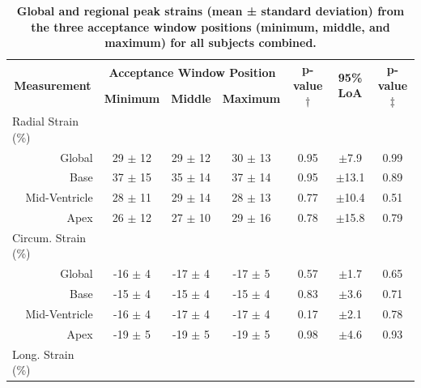 	\begin{landscape}
	\begin{table}
		\centering
		\caption[Global and regional peak strains (mean ± standard deviation) from the three acceptance window positions (minimum, middle, and maximum) for all subjects combined]{\textbf{Global and regional peak strains (mean ± standard deviation) from the three acceptance window positions (minimum, middle, and maximum) for all subjects combined.}}
		\label{table:strainDifferencesPosition}
		\begin{tabular}{c c c c c c c}
			\toprule
			\multirow{2}{*}{\textbf{Measurement}} & \multicolumn{3}{c}{\textbf{Acceptance Window Position}} & \multirow{2}{*}{\textbf{p-value$\dagger$}} & \multirow{2}{*}{\textbf{95\% LoA}}    & \multirow{2}{*}{\textbf{p-value$\ddagger$}} \\ 
			                                      & \textbf{Minimum} & \textbf{Middle} & \textbf{Maximum} & & &    \\
			\midrule
			\multicolumn{1}{l}{Radial Strain (\%)} & & & & & &       								              \\
			\multicolumn{1}{r}{Global}  	  & 29 $\pm$ 12 & 29 $\pm$ 12 & 30 $\pm$ 13 & 0.95 & $\pm$7.9  & 0.99 \\
			\multicolumn{1}{r}{Base}  		  & 37 $\pm$ 15 & 35 $\pm$ 14 & 37 $\pm$ 14 & 0.95 & $\pm$13.1 & 0.89 \\
			\multicolumn{1}{r}{Mid-Ventricle} & 28 $\pm$ 11 & 29 $\pm$ 14 & 28 $\pm$ 13 & 0.77 & $\pm$10.4 & 0.51 \\
			\multicolumn{1}{r}{Apex}  		  & 26 $\pm$ 12 & 27 $\pm$ 10 & 29 $\pm$ 16 & 0.78 & $\pm$15.8 & 0.79 \\
			\multicolumn{1}{l}{Circum. Strain (\%)} & & & & & &								                      \\
			\multicolumn{1}{r}{Global}  	  & -16 $\pm$ 4 & -17 $\pm$ 4 & -17 $\pm$ 5 & 0.57 & $\pm$1.7  & 0.65 \\
			\multicolumn{1}{r}{Base}  		  & -15 $\pm$ 4	& -15 $\pm$ 4 & -15 $\pm$ 4 & 0.83 & $\pm$3.6  & 0.71 \\
			\multicolumn{1}{r}{Mid-Ventricle} & -16 $\pm$ 4 & -17 $\pm$ 4 & -17 $\pm$ 4 & 0.17 & $\pm$2.1  & 0.78 \\	   			\multicolumn{1}{r}{Apex}          & -19 $\pm$ 5 & -19 $\pm$ 5 & -19 $\pm$ 5 & 0.98 & $\pm$4.6  & 0.93 \\
			\multicolumn{1}{l}{Long. Strain (\%)} & & & & & &								    				  \\

\end{tabular}
\end{table}
\end{landscape}
